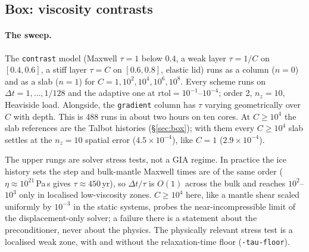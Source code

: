\documentclass[11pt]{article}
\numberwithin{equation}{section}
\newcommand{\code}[1]{\texttt{#1}}
\begin{document}
\subsection{Box: viscosity contrasts}
\label{sec:box-contrast}

\paragraph{The sweep.}
The \code{contrast} model (Maxwell $\tau=1$ below $0.4$, a weak layer
$\tau=1/C$ on $[0.4,0.6]$, a stiff layer $\tau=C$ on $[0.6,0.8]$, elastic
lid) runs as a column ($n=0$) and as a slab ($n=1$) for
$C=1,10^2,10^4,10^6,10^8$. Every scheme runs on $\Delta t=1,\dots,1/128$
and the adaptive one at $\text{rtol}=10^{-1}$--$10^{-4}$; order 2,
$n_z=10$, Heaviside load. Alongside, the \code{gradient} column has
$\tau$ varying geometrically over $C$ with depth. This is 488 runs in
about two hours on ten cores. At $C\ge10^4$ the slab references are the
Talbot histories (\S\ref{sec:box}); with them every $C\ge10^4$ slab
settles at the $n_z=10$ spatial error ($4.5\times10^{-4}$), like $C=1$
($2.9\times10^{-4}$).

The upper rungs are solver stress tests, not a GIA regime. In practice
the ice history sets the step and bulk-mantle Maxwell times are of the
same order ($\eta\approx10^{21}$\,Pa\,s gives $\tau\approx450$\,yr), so
$\Delta t/\tau$ is $O(1)$ across the bulk and reaches $10^{2}$--$10^{3}$
only in localised low-viscosity zones. $C\ge10^4$ here, like a mantle
shear scaled uniformly by $10^{-3}$ in the static systems, probes the
near-incompressible limit of the displacement-only solver; a failure
there is a statement about the preconditioner, never about the physics.
The physically relevant stress test is a localised weak zone, with and
without the relaxation-time floor (\code{-tau-floor}).
\end{document}
